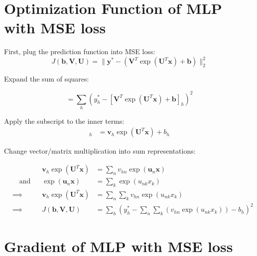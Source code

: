 \documentclass{article}
\renewcommand{\vec}[1]{%
	\bm{#1}%
}
\begin{document}
	
	\section{Optimization Function of MLP with MSE loss}
	First, plug the prediction function into MSE loss:
	\[ J(\vec{b}, \vec{V}, \vec{U}) = \| \vec{y}^* - (\vec{V}^T\exp(\vec{U}^T\vec{x}) + \vec{b}) \|_2^2 \]
	
	Expand the sum of squares:
	
	\[ = \sum_h (y_h^* - [\vec{V}^T\exp(\vec{U}^T\vec{x}) + \vec{b}]_h)^2 \]
	
	Apply the subscript to the inner terms:
	\begin{align*}
	[\vec{V}^T\exp(\vec{U}^T\vec{x}) + \vec{b}]_h &= \vec{v}_h \exp(\vec{U}^T\vec{x}) + b_h
	\end{align*}
	
	Change vector/matrix multiplication into sum representations:
	
	\begin{align*}
		&&\vec{v}_h\exp(\vec{U}^T\vec{x}) &= \sum_n v_{hn} \exp(\vec{u}_n\vec{x})&&\\
		&\quad\text{and}&\exp(\vec{u}_n\vec{x}) &= \sum_k \exp(u_{nk}x_k)&&\\
		&\implies \qquad &\vec{v}_h \exp(\vec{U}^T\vec{x}) &= \sum_n \sum_k v_{hn} \exp(u_{nk}x_k)&&\\
		&\implies \qquad &J(\vec{b},\vec{V},\vec{U}) &= \boxed{\sum_h \left(y_h^* - \sum_n \sum_k \left( v_{hn}\exp(u_{nk}x_k) \right) - b_h \right)^2}&&
	\end{align*}

	
	\section{Gradient of MLP with MSE loss}

	
\end{document}
